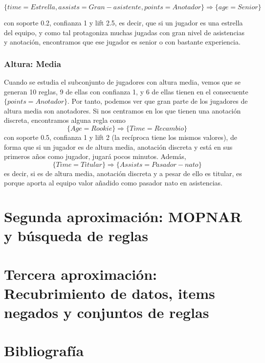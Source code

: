 $$\{time = Estrella, assists = Gran-asistente, points = Anotador\} \Rightarrow \{age = Senior\}$$

con soporte 0.2, confianza 1 y lift 2.5, es decir, que si un jugador es una estrella del equipo, y como tal protagoniza muchas jugadas con gran nivel de asistencias y anotación, encontramos que ese jugador es senior o con bastante experiencia. 

\subsubsection{Altura: Media}
Cuando se estudia el subconjunto de jugadores con altura media, vemos que se generan 10 reglas, 9 de ellas con confianza 1, y 6 de ellas tienen en el consecuente $\{points=Anotador\}$. Por tanto, podemos ver que gran parte de los jugadores de altura media son anotadores. Si nos centramos en los que tienen una anotación discreta, encontramos alguna regla como
$$\{Age=Rookie\} \Rightarrow \{Time = Recambio\}$$
con soporte 0.5, confianza 1 y lift 2 (la recíproca tiene los mismos valores), de forma que si un jugador es de altura media, anotación discreta y está en sus primeros años como jugador, jugará  pocos minutos. Además,
$$\{Time = Titular\} \Rightarrow \{Assists = Pasador-nato\}$$
es decir, si es de altura media, anotación discreta y a pesar de ello es titular, es porque aporta al equipo valor añadido como pasador nato en asistencias. 
 
\section{Segunda aproximación: MOPNAR y búsqueda de reglas}



\section{Tercera aproximación: Recubrimiento de datos, items negados y conjuntos de reglas}


\newpage
\section{Bibliografía}




